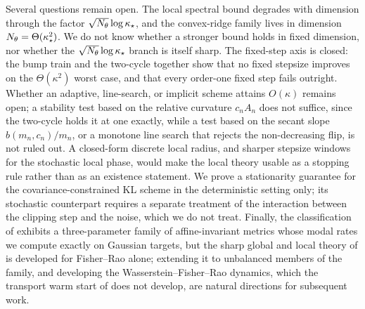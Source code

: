 Several questions remain open. The local spectral bound degrades with dimension
through the factor $\sqrt{N_\theta} \log \kappa_\star$, and the convex-ridge
family lives in dimension
$N_\theta = \Theta(\kappa_\star^2)$. We do not know whether a stronger bound holds
in fixed dimension, nor whether the $\sqrt{N_\theta} \log \kappa_\star$ branch is
itself sharp. The fixed-step axis is closed: the bump train and the two-cycle
together show that no fixed stepsize improves on the $\Theta(\kappa^2)$
worst case, and that every order-one fixed step fails outright. Whether an
adaptive, line-search, or implicit scheme attains $O(\kappa)$ remains open; a
stability test based on the relative curvature $c_nA_n$ does not suffice, since
the two-cycle holds it at one exactly, while a test based on the secant slope
$b(m_n,c_n)/m_n$, or a monotone line search that rejects the non-decreasing
flip, is not ruled out. A closed-form discrete local
radius, and sharper stepsize windows for the stochastic local phase, would make
the local theory usable as a stopping rule rather than as an existence
statement. We prove a stationarity guarantee for the covariance-constrained KL
scheme in the deterministic setting only; its stochastic counterpart requires a
separate treatment of the interaction between the clipping step and the noise,
which we do not treat. Finally, the classification of
 exhibits a three-parameter family of affine-invariant
metrics whose modal rates we compute exactly on Gaussian targets, but the sharp
global and local theory of  is developed for
Fisher--Rao alone; extending it to unbalanced members of the family, and
developing the Wasserstein--Fisher--Rao dynamics, which the transport warm start
of  does not develop, are natural directions for subsequent
work.
